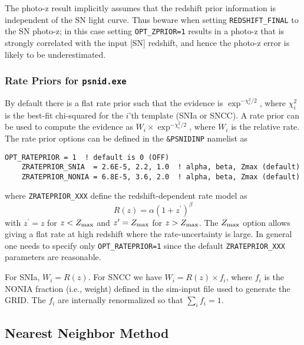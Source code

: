 \documentclass[12pt]{article}
\newcommand{\psnid}{{\tt psnid.exe}}
\newcommand{\zmax}{Z_{\rm max}}
\begin{document}
The photo-z result implicitly assumes
that the redshift prior information is independent
of the SN light curve.
Thus beware when setting  {\tt REDSHIFT\_FINAL}
to the SN photo-z; in this case setting {\tt OPT\_ZPRIOR=1} 
results in a photo-z that is strongly correlated with the 
input [SN] redshift, and hence the photo-z error is likely to be
underestimated.



\clearpage
\subsubsection{Rate Priors for {\psnid}}
\label{sss:psnid_rateprior}

\newcommand{\zprim}{z^{\prime}}

By default there is a flat rate prior such that the evidence is 
$\exp^{-\chi_i^2/2}$, where  $\chi_i^2$ is the best-fit chi-squared
for the $i$'th template (SNIa or SNCC).
A rate prior can be used to compute the evidence as
$W_i \times \exp^{-\chi_i^2/2}$, where $W_i$ is the relative rate.
The rate prior options can be defined in the {\tt \&PSNIDINP}
namelist as

\begin{Verbatim}[frame=single]
    OPT_RATEPRIOR = 1  ! default is 0 (OFF)
    ZRATEPRIOR_SNIA  = 2.6E-5, 2.2, 1.0  ! alpha, beta, Zmax (default)
    ZRATEPRIOR_NONIA = 6.8E-5, 3.6, 2.0  ! alpha, beta, Zmax (default)
\end{Verbatim}
%
where {\tt ZRATEPRIOR\_XXX} define the redshift-dependent
rate model as 
\begin{equation}
  R(z) = \alpha (1+ \zprim)^{\beta}
\end{equation}
%
with $\zprim = z$ for $z < \zmax$ 
and $\zprim = \zmax$ for $z > \zmax$. 
The $\zmax$ option allows giving a flat rate at high redshift where
the rate-uncertainty is large. In general one needs to specify
only {\tt OPT\_RATEPRIOR=1} since the default {\tt ZRATEPRIOR\_XXX}
parameters are reasonable.

For SNIa, $W_i = R(z)$.  For SNCC we have $W_i = R(z) \times f_i$,
where $f_i$ is the NONIA fraction (i.e., weight) 
defined in the sim-input file used to generate the GRID. 
The $f_i$ are internally 
renormalized so that $\sum_i f_i = 1$.

\clearpage
\subsection{Nearest Neighbor Method}
\end{document}
